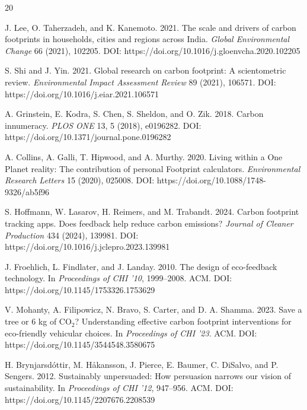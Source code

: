 \documentclass[12pt, a4paper]{article}
\begin{document}
\begin{thebibliography}{20}
\footnotesize

J. Lee, O. Taherzadeh, and K. Kanemoto. 2021. The scale and drivers of carbon footprints in households, cities and regions across India. \textit{Global Environmental Change} 66 (2021), 102205. DOI: https://doi.org/10.1016/j.gloenvcha.2020.102205

S. Shi and J. Yin. 2021. Global research on carbon footprint: A scientometric review. \textit{Environmental Impact Assessment Review} 89 (2021), 106571. DOI: https://doi.org/10.1016/j.eiar.2021.106571

A. Grinstein, E. Kodra, S. Chen, S. Sheldon, and O. Zik. 2018. Carbon innumeracy. \textit{PLOS ONE} 13, 5 (2018), e0196282. DOI: https://doi.org/10.1371/journal.pone.0196282

A. Collins, A. Galli, T. Hipwood, and A. Murthy. 2020. Living within a One Planet reality: The contribution of personal Footprint calculators. \textit{Environmental Research Letters} 15 (2020), 025008. DOI: https://doi.org/10.1088/1748-9326/ab5f96

S. Hoffmann, W. Lasarov, H. Reimers, and M. Trabandt. 2024. Carbon footprint tracking apps. Does feedback help reduce carbon emissions? \textit{Journal of Cleaner Production} 434 (2024), 139981. DOI: https://doi.org/10.1016/j.jclepro.2023.139981

J. Froehlich, L. Findlater, and J. Landay. 2010. The design of eco-feedback technology. In \textit{Proceedings of CHI '10}, 1999--2008. ACM. DOI: https://doi.org/10.1145/1753326.1753629

V. Mohanty, A. Filipowicz, N. Bravo, S. Carter, and D. A. Shamma. 2023. Save a tree or 6 kg of CO$_2$? Understanding effective carbon footprint interventions for eco-friendly vehicular choices. In \textit{Proceedings of CHI '23}. ACM. DOI: https://doi.org/10.1145/3544548.3580675

H. Brynjarsdóttir, M. Håkansson, J. Pierce, E. Baumer, C. DiSalvo, and P. Sengers. 2012. Sustainably unpersuaded: How persuasion narrows our vision of sustainability. In \textit{Proceedings of CHI '12}, 947--956. ACM. DOI: https://doi.org/10.1145/2207676.2208539


\end{thebibliography}
\end{document}
